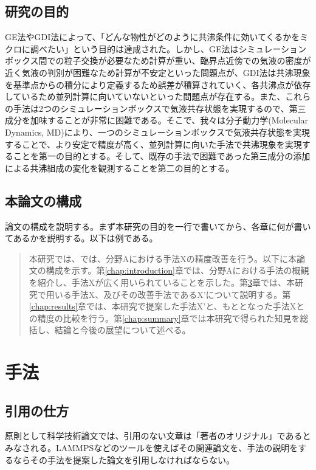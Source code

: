 \documentclass[titlepage]{jsreport}
\begin{document}
\section{研究の目的}
GE法やGDI法によって、「どんな物性がどのように共沸条件に効いてくるかをミクロに調べたい」という目的は達成された。しかし、GE法はシミュレーションボックス間での粒子交換が必要なため計算が重い、臨界点近傍での気液の密度が近く気液の判別が困難なため計算が不安定といった問題点が、GDI法は共沸現象を基準点からの積分により定義するため誤差が積算されていく、各共沸点が依存しているため並列計算に向いていないといった問題点が存在する。また、これらの手法は2つのシミュレーションボックスで気液共存状態を実現するので、第三成分を加味することが非常に困難である。そこで、我々は分子動力学(Molecular Dynamics, MD)\cite{molecular-dynamics}により、一つのシミュレーションボックスで気液共存状態を実現することで、より安定で精度が高く、並列計算に向いた手法で共沸現象を実現することを第一の目的とする。そして、既存の手法で困難であった第三成分の添加による共沸組成の変化を観測することを第二の目的とする。

\section{本論文の構成}

論文の構成を説明する。まず本研究の目的を一行で書いてから、各章に何が書いてあるかを説明する。以下は例である。

\begin{quotation}
    本研究では、では、分野Aにおける手法Xの精度改善を行う。以下に本論文の構成を示す。第\ref{chap:introduction}章では、分野Aにおける手法の概観を紹介し、手法Xが広く用いられていることを示した。第\ref{chap:method}章では、本研究で用いる手法X、及びその改善手法であるX'について説明する。第\ref{chap:results}章では、本研究で提案した手法X'と、もととなった手法Xとの精度の比較を行う。第\ref{chap:summary}章では本研究で得られた知見を総括し、結論と今後の展望について述べる。
\end{quotation}

\chapter{手法} \label{chap:method}

\section{引用の仕方}

原則として科学技術論文では、引用のない文章は「著者のオリジナル」であるとみなされる。LAMMPSなどのツールを使えばその関連論文を、手法の説明をするならその手法を提案した論文を引用しなければならない。
\end{document}
